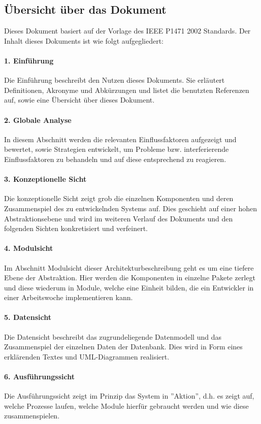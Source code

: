 \subsection{Übersicht über das Dokument}

Dieses Dokument basiert auf der Vorlage des IEEE P1471 2002 Standards. Der Inhalt
dieses Dokuments ist wie folgt aufgegliedert:\\
\paragraph{1. Einführung}
Die Einführung beschreibt den Nutzen dieses Dokuments. Sie erläutert Definitionen,
Akronyme und Abkürzungen und listet die benutzten Referenzen auf, sowie
eine Übersicht über dieses Dokument.
\paragraph{2. Globale Analyse}
In diesem Abschnitt werden die relevanten Einflussfaktoren aufgezeigt und bewertet,
sowie Strategien entwickelt, um Probleme bzw. interferierende Einflussfaktoren
zu behandeln und auf diese entsprechend zu reagieren.
\paragraph{3. Konzeptionelle Sicht}
Die konzeptionelle Sicht zeigt grob die einzelnen Komponenten und deren Zusammenspiel
des zu entwickelnden Systems auf. Dies geschieht auf einer hohen Abstraktionsebene
und wird im weiteren Verlauf des Dokuments und den folgenden
Sichten konkretisiert und verfeinert.
\paragraph{4. Modulsicht}
Im Abschnitt Modulsicht dieser Architekturbeschreibung geht es um eine tiefere
Ebene der Abstraktion. Hier werden die Komponenten in einzelne Pakete zerlegt
und diese wiederum in Module, welche eine Einheit bilden, die ein Entwickler in
einer Arbeitswoche implementieren kann.
\paragraph{5. Datensicht}
Die Datensicht beschreibt das zugrundeliegende Datenmodell und das Zusammenspiel
der einzelnen Daten der Datenbank. Dies wird in Form eines erklärenden
Textes und UML-Diagrammen realisiert.
\paragraph{6. Ausführungssicht}
Die Ausführungssicht zeigt im Prinzip das System in ''Aktion'', d.h. es zeigt auf,
welche Prozesse laufen, welche Module hierfür gebraucht werden und wie diese
zusammenspielen.
